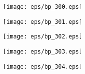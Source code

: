 \documentclass{book}
\begin{document}
	\clearpage\begin{figure}[p]
    \centering
	\texttt{[image: eps/bp\_300.eps]}
	\end{figure}
	\clearpage\begin{figure}[p]
    \centering
	\texttt{[image: eps/bp\_301.eps]}
	\end{figure}
	\clearpage\begin{figure}[p]
    \centering
	\texttt{[image: eps/bp\_302.eps]}
	\end{figure}
	\clearpage\begin{figure}[p]
    \centering
	\texttt{[image: eps/bp\_303.eps]}
	\end{figure}
	\clearpage\begin{figure}[p]
    \centering
	\texttt{[image: eps/bp\_304.eps]}
	\end{figure}
	\clearpage
\end{document}
